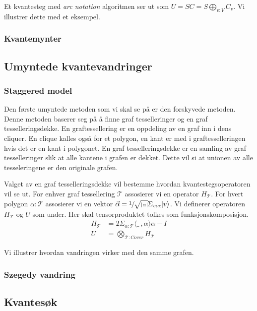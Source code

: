         Et kvantesteg med \emph{arc notation} algoritmen ser ut som $U = SC = S\bigoplus_{v:V}C_v$. Vi illustrer dette med et eksempel.

    \subsubsection*{Kvantemynter}

\subsection{Umyntede kvantevandringer}

    \subsubsection*{Staggered model} %

        Den første umyntede metoden som vi skal se på er den forskyvede metoden. Denne metoden baserer seg på å  finne graf tesselleringer og en graf tesselleringsdekke. En graftessellering er en oppdeling av en graf inn i dens cliquer. En clique kalles også for et polygon, en kant er med i graftesselleringen hvis det er en kant i polygonet. En graf tesselleringsdekke er en samling av graf tesselleringer slik at alle kantene i grafen er dekket. Dette vil si at unionen av alle tesseleringene er den originale grafen.


        Valget av en graf tesselleringsdekke vil bestemme hvordan kvantestegsoperatoren vil se ut. For enhver graf tessellering $\mathcal{T}$ assosierer vi en operator $H_{\mathcal{T}}$. For hvert polygon $\alpha:\mathcal{T}$ assosierer vi en vektor $\vec{\alpha}=\sfrac{1}{\sqrt{|\alpha|}}\Sigma_{v:\alpha}|v\rangle$. Vi definerer operatoren $H_\mathcal{T}$ og $U$ som under. Her skal tensorproduktet tolkes som funksjonskomposisjon.
        \begin{align*}
            H_\mathcal{T} & =2\Sigma_{\alpha:\mathcal{T}}\langle\_\ ,\alpha\rangle\alpha - I \\
            U & = \bigotimes_{\mathcal{T}:Cover}H_\mathcal{T}
        \end{align*}

        Vi illustrer hvordan vandringen virker med den samme grafen.

    \subsubsection*{Szegedy vandring}

\subsection{Kvantesøk}